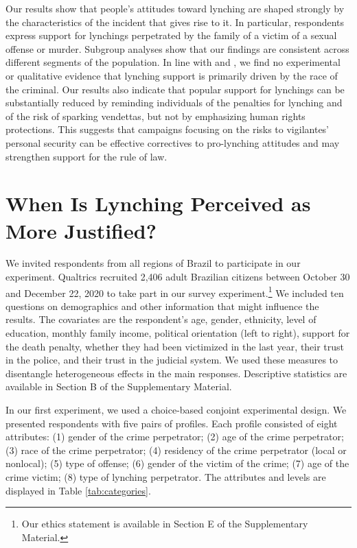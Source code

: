 \documentclass[12pt,a4paper]{article}
\begin{document}
Our results show that people's attitudes toward lynching are shaped strongly by
the characteristics of the incident that gives rise to it. In particular,
respondents express support for lynchings perpetrated by the family of a victim
of a sexual offense or murder. Subgroup analyses show that our findings are
consistent across different segments of the population. In line with
\citet{godoy2006popular} and \citet{martins2015linchamentos}, we find no
experimental or qualitative evidence that lynching support is primarily driven
by the race of the criminal. Our results also indicate that popular support for
lynchings can be substantially reduced by reminding individuals of the
penalties for lynching and of the risk of sparking vendettas, but not by
emphasizing human rights protections. This suggests that campaigns focusing on
the risks to vigilantes' personal security can be effective correctives to
pro-lynching attitudes and may strengthen support for the rule of law. 


\section*{When Is Lynching Perceived as More Justified?}
\label{sec:exp01}

We invited respondents from all regions of Brazil to participate in our
experiment. Qualtrics recruited 2,406 adult Brazilian citizens between October
30 and December 22, 2020 to take part in our survey experiment.\footnote{Our
ethics statement is available in Section E of the Supplementary Material.} We
included ten questions on demographics and other information that might
influence the results. The covariates are the respondent's age, gender,
ethnicity, level of education, monthly family income, political orientation
(left to right), support for the death penalty, whether they had been victimized
in the last year, their trust in the police, and their trust in the judicial
system. We used these measures to disentangle heterogeneous effects in the main
responses. Descriptive statistics are available in Section B of the
Supplementary Material.

In our first experiment, we used a choice-based conjoint experimental design.
We presented respondents with five pairs of profiles. Each profile consisted of
eight attributes: (1) gender of the crime perpetrator; (2) age of the crime
perpetrator; (3) race of the crime perpetrator; (4) residency of the crime
perpetrator (local or nonlocal); (5) type of offense; (6) gender of the victim
of the crime; (7) age of the crime victim; (8) type of lynching perpetrator.
The attributes and levels are displayed in Table \ref{tab:categories}.
\end{document}

